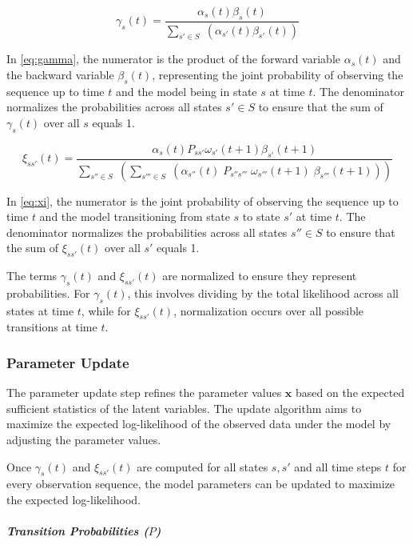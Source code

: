 \begin{equation}
    \gamma_s(t) = \frac{\alpha_s(t) \beta_s(t)}{\sum_{s' \in S} \;(\alpha_{s'}(t) \beta_{s'}(t))}
    \label{eq:gamma}
\end{equation}


In \autoref{eq:gamma}, the numerator is the product of the forward variable $\alpha_s(t)$ and the backward variable $\beta_s(t)$, representing the joint probability of observing the sequence up to time $t$ and the model being in state $s$ at time $t$.
The denominator normalizes the probabilities across all states $s' \in S$ to ensure that the sum of $\gamma_s(t)$ over all $s$ equals 1.


\begin{equation}
    \xi_{ss'}(t) = \frac{\alpha_s(t) P_{ss'} \omega_{s'}(t + 1) \beta_{s'}(t + 1)}{\sum_{s'' \in S} \;(\sum_{s''' \in S} \; (\alpha_{s''}(t) \; P_{s''s'''} \; \omega_{s'''}(t + 1) \; \beta_{s'''}(t + 1)))}
    \label{eq:xi}
\end{equation}


In \autoref{eq:xi}, the numerator is the joint probability of observing the sequence up to time $t$ and the model transitioning from state $s$ to state $s'$ at time $t$.
The denominator normalizes the probabilities across all states $s'' \in S$ to ensure that the sum of $\xi_{ss'}(t)$ over all $s'$ equals 1.

The terms $\gamma_s(t)$ and $\xi_{ss'}(t)$ are normalized to ensure they represent probabilities.
For $\gamma_s(t)$, this involves dividing by the total likelihood across all states at time $t$, while for $\xi_{ss'}(t)$, normalization occurs over all possible transitions at time $t$.

\subsubsection{Parameter Update}
The parameter update step refines the parameter values $\mathbf{x}$ based on the expected sufficient statistics of the latent variables.
The update algorithm aims to maximize the expected log-likelihood of the observed data under the model by adjusting the parameter values.

Once $\gamma_s(t)$ and $\xi_{ss'}(t)$ are computed for all states $s, s'$ and all time steps $t$ for every observation sequence, the model parameters can be updated to maximize the expected log-likelihood.

\paragraph*{\textit{Transition Probabilities ($P$)}}

